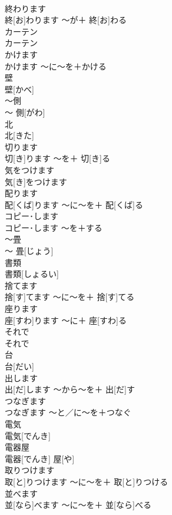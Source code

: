 \documentclass[8pt]{extreport}
\begin{document}
\begin{CJK}{UTF8}{min}
\\	終わります	
\\	終[お]わります	〜が＋ 終[お]わる	
\\	カーテン	
\\	カーテン		
\\	かけます	
\\	かけます	〜に〜を＋かける	
\\	壁	
\\	壁[かべ]		
\\	〜側	
\\	〜 側[がわ]		
\\	北	
\\	北[きた]		
\\	切ります	
\\	切[き]ります	〜を＋ 切[き]る	
\\	気をつけます	
\\	気[き]をつけます		
\\	配ります	
\\	配[くば]ります	〜に〜を＋ 配[くば]る	
\\	コピー･します	
\\	コピー･します	〜を＋する	
\\	〜畳	
\\	〜 畳[じょう]		
\\	書類	
\\	書類[しょるい]		
\\	捨てます	
\\	捨[す]てます	〜に〜を＋ 捨[す]てる	
\\	座ります	
\\	座[すわ]ります	〜に＋ 座[すわ]る	
\\	それで	
\\	それで		
\\	台	
\\	台[だい]		
\\	出します	
\\	出[だ]します	〜から〜を＋ 出[だ]す	
\\	つなぎます	
\\	つなぎます	〜と／に〜を＋つなぐ	
\\	電気	
\\	電気[でんき]		
\\	電器屋	
\\	電器[でんき] 屋[や]		
\\	取りつけます	
\\	取[と]りつけます	〜に〜を＋ 取[と]りつける	
\\	並べます	
\\	並[なら]べます	〜に〜を＋ 並[なら]べる	

\end{CJK}
\end{document}

